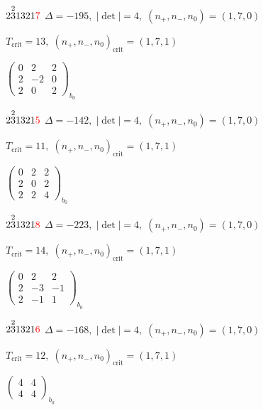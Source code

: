 \documentclass[10pt]{article}
\begin{document}
$2\overset{2}{3}1321\textcolor{red}{7}$ \quad $\Delta=-195,\; |\det|=4,\; (n_+,n_-,n_0)=(1,7,0)$

\hspace{1em}$T_{\text{crit}}=13,\; (n_+,n_-,n_0)_{\text{crit}}=(1,7,1)$

\hspace{2em}$\left(\begin{smallmatrix}0 & 2 & 2 \\ 2 & -2 & 0 \\ 2 & 0 & 2\end{smallmatrix}\right)_{\!b_0}$

$2\overset{2}{3}1321\textcolor{red}{5}$ \quad $\Delta=-142,\; |\det|=4,\; (n_+,n_-,n_0)=(1,7,0)$

\hspace{1em}$T_{\text{crit}}=11,\; (n_+,n_-,n_0)_{\text{crit}}=(1,7,1)$

\hspace{2em}$\left(\begin{smallmatrix}0 & 2 & 2 \\ 2 & 0 & 2 \\ 2 & 2 & 4\end{smallmatrix}\right)_{\!b_0}$

$2\overset{2}{3}1321\textcolor{red}{8}$ \quad $\Delta=-223,\; |\det|=4,\; (n_+,n_-,n_0)=(1,7,0)$

\hspace{1em}$T_{\text{crit}}=14,\; (n_+,n_-,n_0)_{\text{crit}}=(1,7,1)$

\hspace{2em}$\left(\begin{smallmatrix}0 & 2 & 2 \\ 2 & -3 & -1 \\ 2 & -1 & 1\end{smallmatrix}\right)_{\!b_0}$

$2\overset{2}{3}1321\textcolor{red}{6}$ \quad $\Delta=-168,\; |\det|=4,\; (n_+,n_-,n_0)=(1,7,0)$

\hspace{1em}$T_{\text{crit}}=12,\; (n_+,n_-,n_0)_{\text{crit}}=(1,7,1)$

\hspace{2em}$\left(\begin{smallmatrix}4 & 4 \\ 4 & 4\end{smallmatrix}\right)_{\!b_0}$

\smallskip
\end{document}
